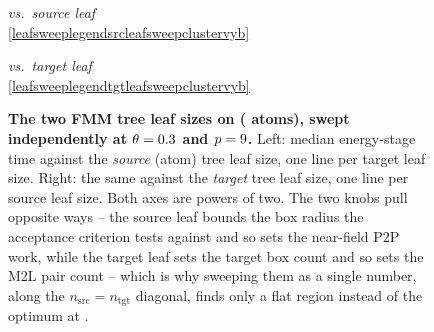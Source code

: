 \begin{figure}[!htb]

\vspace{0.4ex}
\begin{minipage}[t]{7.4cm}
\centering
{\scriptsize\emph{vs.\ source leaf}}\\[0.2ex]
\ref{leafsweeplegendsrcleafsweepclustervyb}
\end{minipage}%
\hspace*{1.5cm}%
\begin{minipage}[t]{7.4cm}
\centering
{\scriptsize\emph{vs.\ target leaf}}\\[0.2ex]
\ref{leafsweeplegendtgtleafsweepclustervyb}
\end{minipage}

\caption[FMM leaf sizes swept independently]{\textbf{The two FMM tree leaf sizes
    on \leafMoleculeleafsweepclustervyb{} (\leafNatomsleafsweepclustervyb{} atoms), swept independently at
    $\theta = 0.3{}$ and $p = 9{}$.} Left: median energy-stage time
    against the \emph{source} (atom) tree leaf size,
    one line per target leaf size. Right: the same against the \emph{target}
    tree leaf size, one line per source leaf size. Both axes are
    powers of two. The two knobs pull opposite ways -- the source leaf bounds the
    box radius the acceptance criterion tests against and so sets the near-field
    P2P work, while the target leaf sets the target box count and so sets the M2L
    pair count -- which is why sweeping them as a single number, along the
    $n_{\mathrm{src}} = n_{\mathrm{tgt}}$ diagonal, finds only a flat region
    instead of the optimum at \leafBestleafsweepclustervyb{}.\leafNaiveNoteleafsweepclustervyb}
\label{fig:leaf_sweep_cluster_6vyb}
\end{figure}

